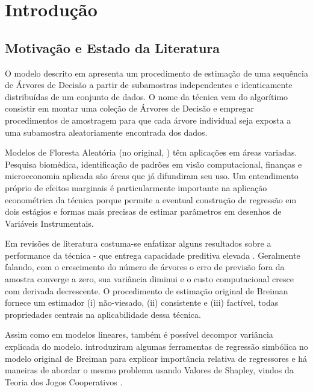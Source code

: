 

\chapter{Introdução}
\label{cap:intro} %
\section{Motivação e Estado da Literatura}

O modelo descrito em \cite{breiman2001random} apresenta um procedimento de estimação de uma sequência de Árvores de Decisão a partir de subamostras independentes e identicamente distribuídas de um conjunto de dados. O nome da técnica vem do algorítimo consistir em montar uma coleção de Árvores de Decisão e empregar procedimentos de amostragem para que cada árvore individual seja exposta a uma subamostra aleatoriamente encontrada dos dados.

Modelos de Floresta Aleatória (no original, ) têm aplicações em áreas variadas. Pesquisa biomédica, identificação de padrões em visão computacional, finanças e microeconomia aplicada são áreas que já difundiram seu uso. Um entendimento próprio de efeitos marginais é particularmente importante na aplicação econométrica da técnica porque permite a eventual construção de regressão em dois estágios e formas mais precisas de estimar parâmetros em desenhos de Variáveis Instrumentais.

Em revisões de literatura \cite{siroky2009navigating, biau2016random} costuma-se enfatizar alguns resultados sobre a performance da técnica - que entrega capacidade preditiva elevada \cite{gu2018empirical}. Geralmente falando, com o crescimento do número de árvores o erro de previsão fora da amostra converge a zero, sua variância diminui e o custo computacional cresce com derivada decrescente. O procedimento de estimação original de Breiman fornece um estimador (i) não-viesado, (ii) consistente e (iii) factível, todas propriedades centrais na aplicabilidade dessa técnica. 

Assim como em modelos lineares, também é possível decompor variância explicada do modelo.  introduziram algumas ferramentas de regressão simbólica no modelo original de Breiman para explicar importância relativa de regressores e há maneiras de abordar o mesmo problema usando Valores de Shapley, vindos da Teoria dos Jogos Cooperativos \cite{cohen2007feature}.

